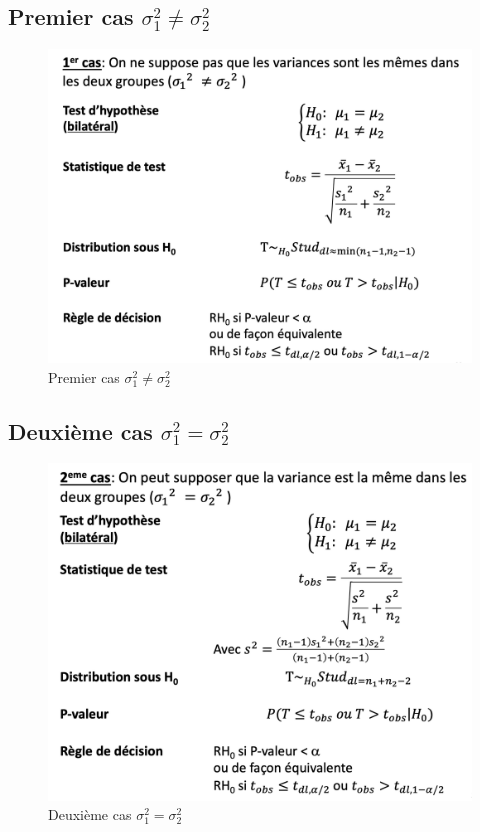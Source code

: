 \subsection{Premier cas $\sigma_1^2 \neq \sigma_2^2$}
\begin{figure}[H]
    \centering
    \includegraphics[scale = 0.5]{images/firstcasecontinu.png}
    \caption{Premier cas $\sigma_1^2 \neq \sigma_2^2$}
    \label{fig:my_label}
\end{figure}

\subsection{Deuxième cas $\sigma_1^2 = \sigma_2^2$}
\begin{figure}[H]
    \centering
    \includegraphics[scale = 0.5]{images/deuxiemecascontinu.png}
    \caption{Deuxième cas $\sigma_1^2 = \sigma_2^2$}
    \label{fig:my_label}
\end{figure}

